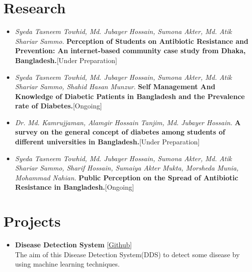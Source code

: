 \documentclass[11pt,a4paper]{moderncv}
\begin{document}
\section{Research}
\begin{itemize}
	
	\item \textit{Syeda Tasneem Towhid, Md. Jubayer Hossain, Sumona Akter, Md. 
	Atik Shariar Sammo.} \textbf{Perception of Students on Antibiotic 
	Resistance and Prevention: An internet-based community case study from 
	Dhaka, Bangladesh.}\hfill [Under Preparation] 
	\item \textit{Syeda Tasneem Towhid, Md. Jubayer Hossain, Sumona Akter, Md. 
	Atik Shariar Sammo, 
	Shahid Hasan Munzur.} \textbf{Self Management And Knowledge of Diabetic 
	Patients in Bangladesh and the Prevalence rate of Diabetes.}\hfill [Ongoing]
	\item \textit{Dr. Md. Kamrujjaman, Alamgir Hossain Tanjim, Md. Jubayer 
	Hossain.} \textbf{A survey on the general concept of diabetes among 
	students of different universities in Bangladesh.}\hfill [Under Preparation]
	
	\item \textit{Syeda Tasneem Towhid, Md. Jubayer Hossain, Sumona Akter, Md. 
	Atik Shariar Sammo, Sharif Hossain, Sumaiya Akter Mukta, Morsheda Munia, 
	Mohammad Nahian.} \textbf{Public Perception on the Spread of Antibiotic 
	Resistance in Bangladesh.}\hfill [Ongoing]
\end{itemize}

\section{Projects}
\begin{itemize}	
	\item\textbf{Disease Detection System} 
	\hfill [\href{https://github.com/hdrobd/DDS}{Github}]\\
	The aim of this Disease Detection System(DDS) to detect some disease by 
	using machine learning techniques.
\end{itemize}

\pagebreak

\end{document}

